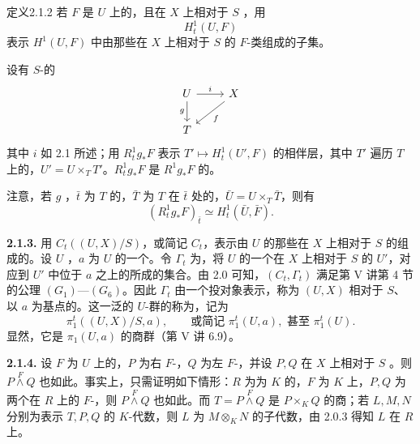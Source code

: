 \begin{SGAresult}{定义}{2.1.2}
若 $F$ 是 $U$ 上的，且在 $X$ 上相对于 $S$ ，用
\[H^1_t(U,F)\]
表示 $H^1(U,F)$ 中由那些在 $X$ 上相对于 $S$ 的 $F$-类组成的子集。
\end{SGAresult}
设有 $S$-的
\[
\begin{tikzcd}
U\arrow[r,"i"]\arrow[d,"g"']&X\arrow[dl,"f"]\\
T&
\end{tikzcd}
\]
其中 $i$ 如 2.1 所述；用 $R^1_tg_*F$ 表示 $T'\mapsto H^1_t(U',F)$ 的相伴层，其中 $T'$ 遍历 $T$ 上的，$U'=U\times_TT'$。$R^1_tg_*F$ 是 $R^1g_*F$ 的。

注意，若 $g$ ，$\bar t$ 为 $T$ 的，$\bar T$ 为 $T$ 在 $\bar t$ 处的，$\bar U=U\times_T\bar T$，则有
\[(R^1_tg_*F)_{\bar t}\simeq H^1_t(\bar U,\bar F).\tag{2.1.2.1}\]

\textbf{2.1.3.} 用 $C_t((U,X)/S)$，或简记 $C_t$，表示由 $U$ 的那些在 $X$ 上相对于 $S$ 的组成的。设 $U$ ，$a$ 为 $U$ 的一个。令 $\Gamma_t$ 为，将 $U$ 的一个在 $X$ 上相对于 $S$ 的 $U'$，对应到 $U'$ 中位于 $a$ 之上的所成的集合。由 2.0 可知，$(C_t,\Gamma_t)$ 满足第 V 讲第 4 节的公理 $(G_1)$—$(G_6)$。因此 $\Gamma_t$ 由一个投对象表示，称为 $(U,X)$ 相对于 $S$、以 $a$ 为基点的。这一泛的 $U$-群的称为，记为
\[\pi_1^t((U,X)/S,a),\qquad\text{或简记 }\pi_1^t(U,a),\text{ 甚至 }\pi_1^t(U).\]
显然，它是 $\pi_1(U,a)$ 的商群（第 V 讲 6.9）。

\textbf{2.1.4.} 设 $F$ 为 $U$ 上的，$P$ 为右 $F$-，$Q$ 为左 $F$-，并设 $P,Q$ 在 $X$ 上相对于 $S$ 。则 $P\overset F\wedge Q$ 也如此。事实上，只需证明如下情形：$R$ 为为 $K$ 的，$F$ 为 $K$ 上，$P,Q$ 为两个在 $R$ 上的 $F$-，则 $P\overset F\wedge Q$ 也如此。而 $T=P\overset F\wedge Q$ 是 $P\times_KQ$ 的商；若 $L,M,N$ 分别为表示 $T,P,Q$ 的 $K$-代数，则 $L$ 为 $M\otimes_KN$ 的子代数，由 2.0.3 得知 $L$ 在 $R$ 上。

